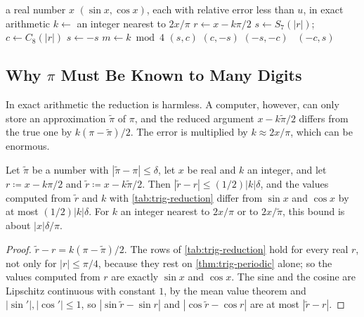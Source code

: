 \begin{algorithm}
\begin{algorithmic}[1]
\Require a real number $x$
\Ensure $(\sin x,\cos x)$, each with relative error less than $u$, in exact arithmetic
\State $k\gets$ an integer nearest to $2x/\pi$
\State $r\gets x-k\pi/2$ 
\State $s\gets S_7(|r|)$;\quad $c\gets C_8(|r|)$ 
 $s\gets-s$
\EndIf
\State $m\gets k\bmod4$
 \Return $(s,c)$
 \Return $(c,-s)$
 \Return $(-s,-c)$
\Else\ \Return $(-c,s)$
\EndIf
\end{algorithmic}
\caption{The sine and the cosine by argument reduction (\cref{prop:trig-reduction}). The polynomials are evaluated as $S_7(r)=r\,p(r^2)$ and $C_8(r)=q(r^2)$ with polynomials $p$ and $q$ of degrees $7$ and $8$. Line 2 is exact only if $\pi$ is; in floating-point arithmetic it requires $\pi$ to many more digits than the working precision.}
\label{alg:sincos}
\end{algorithm}

\subsection{Why \texorpdfstring{$\pi$}{pi} Must Be Known to Many Digits}

In exact arithmetic the reduction is harmless. A computer, however, can only store an approximation $\tilde\pi$ of $\pi$, and the reduced argument $x-k\tilde\pi/2$ differs from the true one by $k(\pi-\tilde\pi)/2$. The error is multiplied by $k\approx2x/\pi$, which can be enormous.

\begin{proposition}
\label{prop:reduction-error}
Let $\tilde\pi$ be a number with $|\tilde\pi-\pi|\le\delta$, let $x$ be real and $k$ an integer, and let $r\coloneqq x-k\pi/2$ and $\tilde r\coloneqq x-k\tilde\pi/2$. Then $|\tilde r-r|\le(1/2)|k|\delta$, and the values computed from $\tilde r$ and $k$ with \cref{tab:trig-reduction} differ from $\sin x$ and $\cos x$ by at most $(1/2)|k|\delta$. For $k$ an integer nearest to $2x/\pi$ or to $2x/\tilde\pi$, this bound is about $|x|\delta/\pi$.
\end{proposition}

\begin{proof}
$\tilde r-r=k(\pi-\tilde\pi)/2$. The rows of \cref{tab:trig-reduction} hold for every real $r$, not only for $|r|\le\pi/4$, because they rest on \cref{thm:trig-periodic} alone; so the values computed from $r$ are exactly $\sin x$ and $\cos x$. The sine and the cosine are Lipschitz continuous with constant $1$, by the mean value theorem and $|\sin'|,|\cos'|\le1$, so $|\sin\tilde r-\sin r|$ and $|\cos\tilde r-\cos r|$ are at most $|\tilde r-r|$.
\end{proof}

